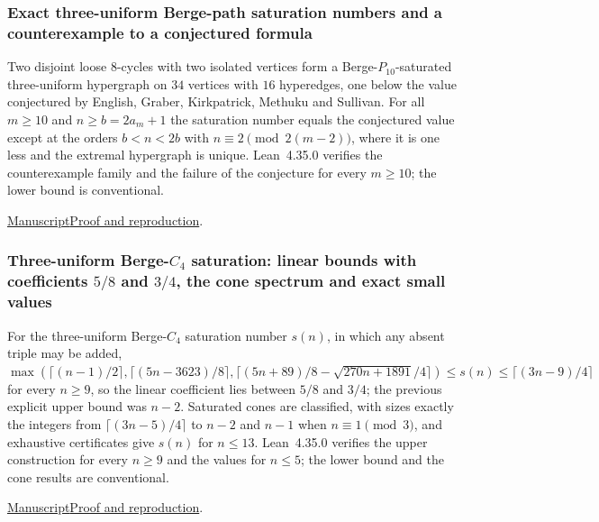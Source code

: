 \documentclass[11pt,a4paper]{article}
\begin{document}
\subsubsection{Exact three-uniform Berge-path saturation numbers and a counterexample to a conjectured formula}

Two disjoint loose $8$-cycles with two isolated vertices form a Berge-$P_{10}$-saturated three-uniform hypergraph on $34$ vertices with $16$ hyperedges, one below the value conjectured by English, Graber, Kirkpatrick, Methuku and Sullivan. For all $m\ge10$ and $n\ge b=2a_m+1$ the saturation number equals the conjectured value except at the orders $b<n<2b$ with $n\equiv2\pmod{2(m-2)}$, where it is one less and the extremal hypergraph is unique. Lean~4.35.0 verifies the counterexample family and the failure of the conjecture for every $m\ge10$; the lower bound is conventional.

\noindent\href{https://github.com/dvgyl/math-and-theory/blob/main/papers/mathematics/berge-path-saturation/manuscript.pdf}{Manuscript}\quad\href{https://github.com/dvgyl/math-and-theory/blob/main/papers/mathematics/berge-path-saturation/README.md}{Proof and reproduction}.

\subsubsection{Three-uniform Berge-$C_4$ saturation: linear bounds with coefficients $5/8$ and $3/4$, the cone spectrum and exact small values}

For the three-uniform Berge-$C_4$ saturation number $s(n)$, in which any absent triple may be added, $\max(\lceil(n-1)/2\rceil,\lceil(5n-3623)/8\rceil,\lceil(5n+89)/8-\sqrt{270n+1891}/4\rceil)\le s(n)\le\lceil(3n-9)/4\rceil$ for every $n\ge9$, so the linear coefficient lies between $5/8$ and $3/4$; the previous explicit upper bound was $n-2$. Saturated cones are classified, with sizes exactly the integers from $\lceil(3n-5)/4\rceil$ to $n-2$ and $n-1$ when $n\equiv1\pmod3$, and exhaustive certificates give $s(n)$ for $n\le13$. Lean~4.35.0 verifies the upper construction for every $n\ge9$ and the values for $n\le5$; the lower bound and the cone results are conventional.

\noindent\href{https://github.com/dvgyl/math-and-theory/blob/main/papers/mathematics/berge-c4-saturation/manuscript.pdf}{Manuscript}\quad\href{https://github.com/dvgyl/math-and-theory/blob/main/papers/mathematics/berge-c4-saturation/README.md}{Proof and reproduction}.
\end{document}
